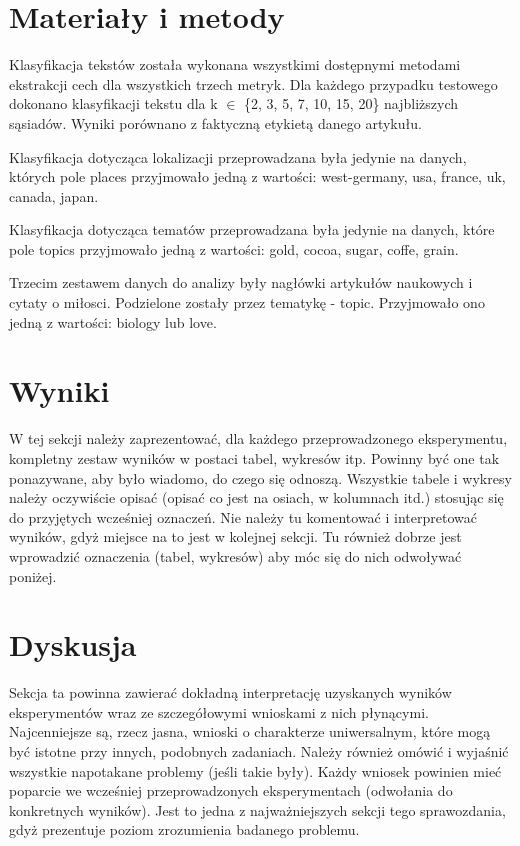 \documentclass{classrep}
\begin{document}
\section{Materiały i metody}
Klasyfikacja tekstów została wykonana wszystkimi dostępnymi metodami ekstrakcji cech dla wszystkich trzech metryk. Dla każdego przypadku testowego dokonano klasyfikacji tekstu dla k $\in$ \{2, 3, 5, 7, 10, 15, 20\} najbliższych sąsiadów. Wyniki porównano z faktyczną etykietą danego artykułu. \newline

Klasyfikacja dotycząca lokalizacji przeprowadzana była jedynie na danych, których pole places przyjmowało jedną z wartości: west-germany, usa, france, uk, canada, japan.
\newline

Klasyfikacja dotycząca tematów przeprowadzana była jedynie na danych, które pole topics przyjmowało jedną z wartości: gold, cocoa, sugar, coffe, grain.


Trzecim zestawem danych do analizy były nagłówki artykułów naukowych i cytaty o miłosci. Podzielone zostały przez tematykę - topic. Przyjmowało ono jedną z wartości: biology lub love.

\section{Wyniki}

{\color{blue}
W tej sekcji należy zaprezentować, dla każdego przeprowadzonego eksperymentu,
kompletny zestaw wyników w postaci tabel, wykresów itp. Powinny być one tak
ponazywane, aby było wiadomo, do czego się odnoszą. Wszystkie tabele i wykresy
należy oczywiście opisać (opisać co jest na osiach, w kolumnach itd.) stosując
się do przyjętych wcześniej oznaczeń. Nie należy tu komentować i interpretować
wyników, gdyż miejsce na to jest w kolejnej sekcji. Tu również dobrze jest
wprowadzić oznaczenia (tabel, wykresów) aby móc się do nich odwoływać
poniżej.}

\section{Dyskusja}
{\color{blue}
Sekcja ta powinna zawierać dokładną interpretację uzyskanych wyników
eksperymentów wraz ze szczegółowymi wnioskami z nich płynącymi. Najcenniejsze
są, rzecz jasna, wnioski o charakterze uniwersalnym, które mogą być istotne
przy innych, podobnych zadaniach. Należy również omówić i wyjaśnić wszystkie
napotakane problemy (jeśli takie były). Każdy wniosek powinien mieć poparcie
we wcześniej przeprowadzonych eksperymentach (odwołania do konkretnych
wyników). Jest to jedna z najważniejszych sekcji tego sprawozdania, gdyż
prezentuje poziom zrozumienia badanego problemu.}
\end{document}
